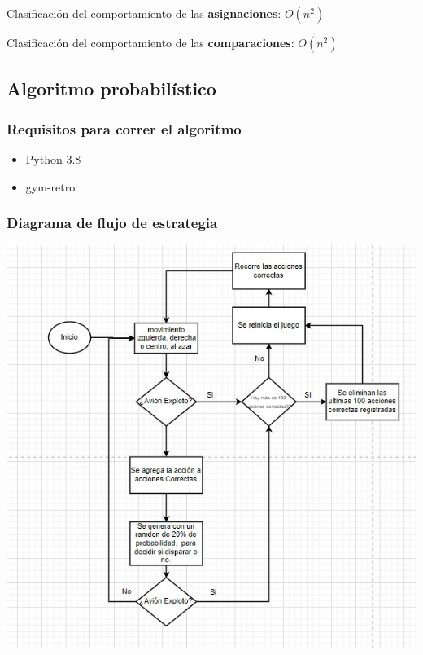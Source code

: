 \documentclass{article}
\begin{document}
Clasificación del comportamiento de las \textbf{asignaciones}: \(O(n^{2})\)

Clasificación del comportamiento de las \textbf{comparaciones}: \(O(n^{2})\)




\newpage
\subsection{Algoritmo probabilístico}
\subsubsection{Requisitos para correr el algoritmo}
\begin{itemize}
  \item Python 3.8
  \item gym-retro
\end{itemize}

\subsubsection{Diagrama de flujo de estrategia}
\begin{center}
  \includegraphics[scale=0.65]{prob/flujo.jpeg}
\end{center}
\end{document}
